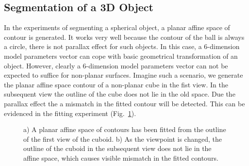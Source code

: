 \subsection{Segmentation of a 3D Object}
\label{sec:s3o}
In the experiments of segmenting a spherical object, a planar
affine space of contour is generated. It works very well because the
contour of the ball is always a circle, there is not parallax effect
for such objects. In this case, a 6-dimension model parameters vector
can cope with basic geometrical transformation of an object. However,
clearly a 6-dimension model parameters vector can not be expected to
suffice for non-planar surfaces. Imagine such a scenario, we generate the  planar affine
space contour of a non-planar cube in the fist view. In the
subsequent view the outline of the cube does not lie in the old
space. Due the parallax effect the a mismatch in the fitted contour
will be detected. This can be evidenced in the fitting experiment (Fig.~\ref{fig:box_mismatch}).
\begin{figure}[htbp]
  \begin{minipage}[t]{0.5\linewidth} 
    \centering 
  \end{minipage}%
  \begin{minipage}[t]{0.5\linewidth} 
    \centering 
  \end{minipage} 
  \caption[Planar space can not encompass a general non-planar
  contour]{a) A planar affine space of contours has been fitted from
    the outline of the first view of the cuboid. b) As the viewpoint
    is changed, the outline of the cuboid in the subsequent view does
    not lie in the affine space, which causes visible mismatch in the
    fitted contours.}
\label{fig:box_mismatch}
\end{figure}


